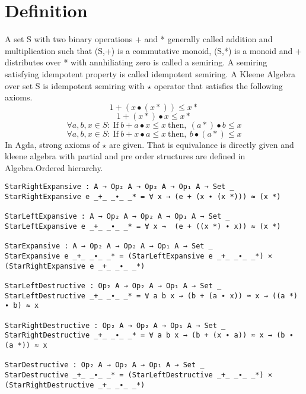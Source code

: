 \section{Definition}
A set S with two binary operations + and * generally called addition and
multiplication such that (S,+) is a commutative monoid, (S,*) is a monoid and +
distributes over * with annhiliating zero is called a semiring. A semiring
satisfying idempotent property is called idempotent semiring. A Kleene Algebra
over set S is idempotent semiring with \( \star \) operator that satisfies the
following axioms.
\begin{equation}\label{eq_starrightexpansive}
1 + (x ∙ (x *)) \leq x *
\end{equation}
\begin{equation}\label{eq_starleftexpansive}
1 + (x *) ∙ x \leq x *
\end{equation}
\begin{equation}\label{eq_starleftdestructive}
\forall a, b, x \in S: \  \text{If} \ b + a  ∙ x \leq x \ \text{then},\  (a *)  ∙ b \leq x
\end{equation}
\begin{equation}\label{eq_starrightdestructive}
\forall a, b, x \in S: \  \text{If} \ b + x  ∙ a \leq x \  \text{then},\  b  ∙ (a *) \leq x
\end{equation}
In Agda, strong axioms of \(\star\) are given. That is equivalance is directly
given and kleene algebra with partial and pre order structures are defined in
Algebra.Ordered hierarchy. 
\begin{verbatim}
StarRightExpansive : A → Op₂ A → Op₂ A → Op₁ A → Set _
StarRightExpansive e _+_ _∙_ _* = ∀ x → (e + (x ∙ (x *))) ≈ (x *)

StarLeftExpansive : A → Op₂ A → Op₂ A → Op₁ A → Set _
StarLeftExpansive e _+_ _∙_ _* = ∀ x →  (e + ((x *) ∙ x)) ≈ (x *)

StarExpansive : A → Op₂ A → Op₂ A → Op₁ A → Set _
StarExpansive e _+_ _∙_ _* = (StarLeftExpansive e _+_ _∙_ _*) × (StarRightExpansive e _+_ _∙_ _*)

StarLeftDestructive : Op₂ A → Op₂ A → Op₁ A → Set _
StarLeftDestructive _+_ _∙_ _* = ∀ a b x → (b + (a ∙ x)) ≈ x → ((a *) ∙ b) ≈ x

StarRightDestructive : Op₂ A → Op₂ A → Op₁ A → Set _
StarRightDestructive _+_ _∙_ _* = ∀ a b x → (b + (x ∙ a)) ≈ x → (b ∙ (a *)) ≈ x

StarDestructive : Op₂ A → Op₂ A → Op₁ A → Set _
StarDestructive _+_ _∙_ _* = (StarLeftDestructive _+_ _∙_ _*) × (StarRightDestructive _+_ _∙_ _*)
\end{verbatim}

